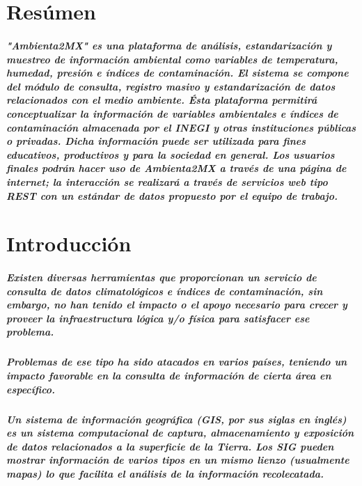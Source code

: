 \documentclass[12pt]{report}
\author{Jimenez García Eduardo Gamaliel\and Resendiz Arteaga Juan Alberto}
\begin{document}
\chapter{Resúmen}
\paragraph{"Ambienta2MX" es una plataforma de análisis, estandarización y muestreo de información ambiental como variables de temperatura, humedad, presión e índices de contaminación. El sistema se compone del módulo de consulta, registro masivo y estandarización de datos relacionados con el medio ambiente. Ésta plataforma permitirá conceptualizar la información de variables ambientales e índices de contaminación almacenada por el INEGI y otras instituciones públicas o privadas. Dicha información puede ser utilizada para fines educativos, productivos y para la sociedad en general.  Los usuarios finales podrán hacer uso de Ambienta2MX a través de una página de internet; la interacción se realizará a través de servicios web tipo REST con un estándar de datos propuesto por el equipo de trabajo.}

\chapter{Introducción}
  \paragraph{Existen diversas herramientas que proporcionan un servicio de consulta de datos climatológicos e índices de contaminación, sin embargo, no han tenido el impacto o el apoyo necesario para crecer y proveer la infraestructura lógica y/o física para satisfacer ese problema.}

  \paragraph{Problemas de ese tipo ha sido atacados en varios países, teniendo un impacto favorable en la consulta de información de cierta área en específico.}

  \paragraph{Un sistema de información geográfica (GIS, por sus siglas en inglés) es un sistema computacional de captura, almacenamiento y exposición de datos relacionados a la superficie de la Tierra. Los SIG pueden mostrar información de varios tipos en un mismo lienzo (usualmente mapas) lo que facilita el análisis de la información recolecatada.}
\end{document}
